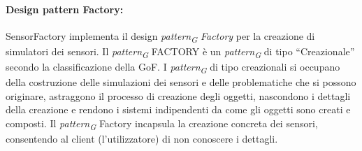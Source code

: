 \paragraph{Design pattern Factory:}
SensorFactory implementa il design \textit{pattern}\textsubscript{\textit{G}} \textit{Factory} per la creazione di simulatori dei sensori.
Il \textit{pattern}\textsubscript{\textit{G}} FACTORY è un \textit{pattern}\textsubscript{\textit{G}} di tipo “Creazionale” secondo la classificazione della GoF.
I \textit{pattern}\textsubscript{\textit{G}} di tipo creazionali si occupano della costruzione delle simulazioni dei sensori e delle problematiche che si possono originare, astraggono il processo di creazione degli oggetti, nascondono i dettagli della creazione e rendono i sistemi indipendenti da come gli oggetti sono creati e composti.
Il \textit{pattern}\textsubscript{\textit{G}} Factory incapsula la creazione concreta dei sensori, consentendo al client
(l’utilizzatore) di non conoscere i dettagli.


